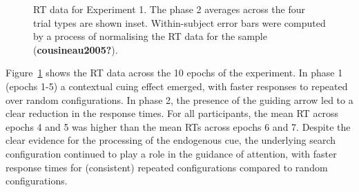 \documentclass[
  man,
  floatsintext,
  longtable,
  nolmodern,
  notxfonts,
  notimes,
  colorlinks=true,linkcolor=blue,citecolor=blue,urlcolor=blue]{apa7}
\begin{document}
\begin{figure}[H]


\caption{\label{fig-RT-exp1}RT data for Experiment 1. The phase 2
averages across the four trial types are shown inset. Within-subject
error bars were computed by a process of normalising the RT data for the
sample (\textbf{cousineau2005?}).}

\end{figure}%

Figure~\ref{fig-RT-exp1} shows the RT data across the 10 epochs of the
experiment. In phase 1 (epochs 1-5) a contextual cuing effect emerged,
with faster responses to repeated over random configurations. In phase
2, the presence of the guiding arrow led to a clear reduction in the
response times. For all participants, the mean RT across epochs 4 and 5
was higher than the mean RTs across epochs 6 and 7. Despite the clear
evidence for the processing of the endogenous cue, the underlying search
configuration continued to play a role in the guidance of attention,
with faster response times for (consistent) repeated configurations
compared to random configurations.
\end{document}
